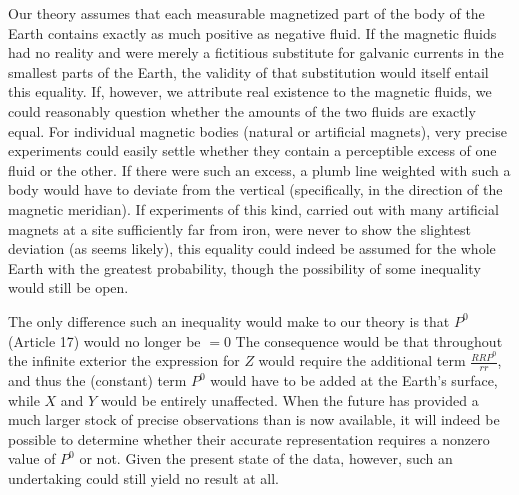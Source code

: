 Our theory assumes that each measurable magnetized part of the body of the Earth contains exactly as much positive as negative fluid. If the magnetic fluids had no reality and were merely a fictitious substitute for galvanic currents in the smallest parts of the Earth, the validity of that substitution would itself entail this equality. If, however, we attribute real existence to the magnetic fluids, we could reasonably question whether the amounts of the two fluids are exactly equal. For individual magnetic bodies (natural or artificial magnets), very precise experiments could easily settle whether they contain a perceptible excess of one fluid or the other. If there were such an excess, a plumb line weighted with such a body would have to deviate from the vertical (specifically, in the direction of the magnetic meridian). If experiments of this kind, carried out with many artificial magnets at a site sufficiently far from iron, were never to show the slightest deviation (as seems likely), this equality could indeed be assumed for the whole Earth with the greatest probability, though the possibility of some inequality would still be open.

The only difference such an inequality would make to our theory is that $P^0$ (Article 17) would no longer be $=0$ The consequence would be that throughout the infinite exterior the expression for $Z$ would require the additional term $\frac{RRP^0}{rr}$, and thus the (constant) term $P^0$ would have to be added at the Earth's surface, while $X$ and $Y$ would be entirely unaffected. When the future has provided a much larger stock of precise observations than is now available, it will indeed be possible to determine whether their accurate representation requires a nonzero value of $P^0$ or not. Given the present state of the data, however, such an undertaking could still yield no result at all.
